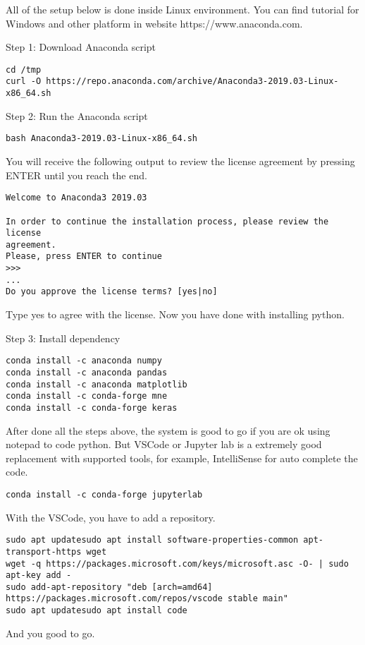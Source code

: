 All of the setup below is done inside Linux environment. You can find tutorial for Windows and other platform in website https://www.anaconda.com.

Step 1: Download Anaconda script
\begin{lstlisting}
cd /tmp
curl -O https://repo.anaconda.com/archive/Anaconda3-2019.03-Linux-x86_64.sh
\end{lstlisting}

\bigskip
Step 2: Run the Anaconda script
\begin{lstlisting}
bash Anaconda3-2019.03-Linux-x86_64.sh
\end{lstlisting}
You will receive the following output to review the license agreement by pressing ENTER until you reach the end.
\begin{lstlisting}
Welcome to Anaconda3 2019.03

In order to continue the installation process, please review the license
agreement.
Please, press ENTER to continue
>>>
...
Do you approve the license terms? [yes|no]
\end{lstlisting}
Type yes to agree with the license.
Now you have done with installing python.

\bigskip
Step 3: Install dependency
\begin{lstlisting}
conda install -c anaconda numpy
conda install -c anaconda pandas
conda install -c anaconda matplotlib
conda install -c conda-forge mne
conda install -c conda-forge keras
\end{lstlisting}
After done all the steps above, the system is good to go if you are ok using notepad to code python. But VSCode or Jupyter lab is a extremely good replacement with supported tools, for example, IntelliSense for auto complete the code.
\begin{lstlisting}
conda install -c conda-forge jupyterlab
\end{lstlisting}
With the VSCode, you have to add a repository.
\begin{lstlisting}
sudo apt updatesudo apt install software-properties-common apt-transport-https wget
wget -q https://packages.microsoft.com/keys/microsoft.asc -O- | sudo apt-key add -
sudo add-apt-repository "deb [arch=amd64] https://packages.microsoft.com/repos/vscode stable main"
sudo apt updatesudo apt install code
\end{lstlisting}
And you good to go.